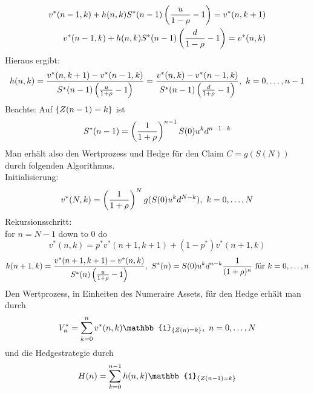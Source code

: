 \begin{equation*}
\begin{aligned}
	v^*(n-1,k)+h(n,k)S^*(n-1)\left( \frac{u}{1-\rho}-1\right)=v^*(n,k+1)\\
	v^*(n-1,k)+h(n,k)S^*(n-1)\left( \frac{d}{1-\rho}-1\right)=v^*(n,k)	
\end{aligned}
\end{equation*}
Hieraus ergibt:
\begin{equation*}
\begin{aligned}
	h(n,k)=\frac{v^*(n,k+1)-v^*(n-1,k)}{S^*(n-1)\left( \frac{u}{1+\rho}-1\right)}=\frac{v^*(n,k)-v^*(n-1,k)}{S^*(n-1)\left( \frac{d}{1+\rho}-1\right)},~k=0, \dots ,n-1
\end{aligned}
\end{equation*}
Beachte: Auf $\left\{Z(n-1)=k\right\}$ ist
\[
S^*(n-1)=\left( \frac{1}{1+\rho}\right)^{n-1}S(0)u^kd^{n-1-k}
\]
Man erhält also den Wertprozess und Hedge für den Claim $C=g(S(N))$ durch folgenden Algorithmus.\\
Initialisierung:
\[
v^*(N,k)=\left( \frac{1}{1+\rho}\right)^Ng(S(0)u^kd^{N-k}),~k=0, \dots ,N
\]
Rekursionsschritt:\\
for $n=N-1$ down to 0 do
\[
v^*(n,k)=p^*v^*(n+1,k+1)+(1-p^*)v^*(n+1,k)
\]
\[
h(n+1,k)=\frac{v^*(n+1,k+1)-v^*(n,k)}{S^*(n)\left( \frac{u}{1+\rho}-1\right)},~S^*(n)=S(0)u^kd^{n-k}\frac{1}{(1+\rho)^n}\text{ für }k=0, \dots ,n
\]
Den Wertprozess, in Einheiten des Numeraire Assets, für den Hedge erhält man durch
\[
V_n^*=\sum_{k=0}^{n}v^*(n,k)\mathbb{1}_{\penbrace{Z(n)=k}},~n=0\dt{,}N
\]
und die Hedgestrategie durch
\[
H(n)=\sum_{k=0}^{n-1}h(n,k)\mathbb{1}_{\penbrace{Z(n-1)=k}}
\]

